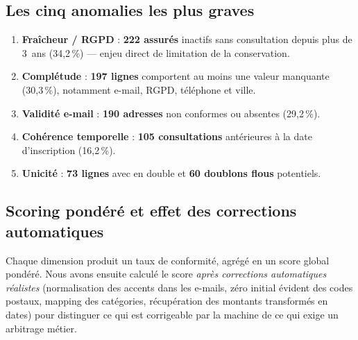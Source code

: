\documentclass[11pt]{article}
\newcommand{\code}[1]{\texttt{\seqsplit{#1}}}
\begin{document}
\subsection{Les cinq anomalies les plus graves}

\begin{enumerate}
    \item \textbf{Fraîcheur / RGPD} : \textbf{222 assurés} inactifs sans consultation
          depuis plus de 3~ans (34,2\,\%) --- enjeu direct de limitation de la
          conservation.
    \item \textbf{Complétude} : \textbf{197 lignes} comportent au moins une valeur
          manquante (30,3\,\%), notamment e-mail, RGPD, téléphone et ville.
    \item \textbf{Validité e-mail} : \textbf{190 adresses} non conformes ou absentes
          (29,2\,\%).
    \item \textbf{Cohérence temporelle} : \textbf{105 consultations} antérieures à la
          date d'inscription (16,2\,\%).
    \item \textbf{Unicité} : \textbf{73 lignes} avec \code{id\_assure} en double et
          \textbf{60 doublons flous} potentiels.
\end{enumerate}

\subsection{Scoring pondéré et effet des corrections automatiques}

Chaque dimension produit un taux de conformité, agrégé en un score global pondéré.
Nous avons ensuite calculé le score \emph{après corrections automatiques réalistes}
(normalisation des accents dans les e-mails, zéro initial évident des codes postaux,
mapping des catégories, récupération des montants transformés en dates) pour
distinguer ce qui est corrigeable par la machine de ce qui exige un arbitrage métier.
\end{document}

